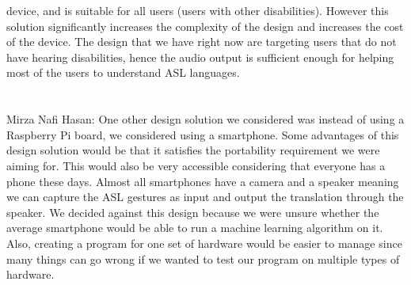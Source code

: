 \documentclass[12pt, titlepage]{article}
\begin{document}
\begin{enumerate}
  device, and is suitable for all users (users with other disabilities). However this solution significantly increases the complexity of the design and 
  increases the cost of the device. The design that we have right now are targeting users that do not have hearing disabilities, hence the audio output 
  is sufficient enough for helping most of the users to understand ASL languages.
  \\
  ~\\
  \\
    Mirza Nafi Hasan: One other design solution we considered was instead of using a Raspberry Pi board, we considered using a smartphone. Some advantages of 
    this design solution would be that it satisfies the portability requirement we were aiming for. This would also be very accessible considering that everyone
    has a phone these days. Almost all smartphones have a camera and a speaker meaning we can capture the ASL gestures as input and output the translation 
    through the speaker. We decided against this design because we were unsure whether the average smartphone would be able to run a machine learning algorithm
    on it. Also, creating a program for one set of hardware would be easier to manage since many things can go wrong if we wanted to test our program on 
    multiple types of hardware.
  \\
  
\end{enumerate}
\end{document}
